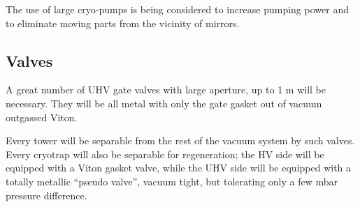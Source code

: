 The use of large cryo-pumps is being considered to increase pumping power and to eliminate moving parts from the vicinity of mirrors. 

\subsection{Valves} 
A great number of UHV gate valves with large aperture, up to 1 m will be necessary. They will be all metal with only the gate gasket out of vacuum outgassed Viton. 

Every tower will be separable from the rest of the vacuum system by such valves. Every cryotrap will also be separable for regeneration; the HV side will be equipped with a Viton gasket valve, while the UHV side will be equipped with a totally metallic ``pseudo valve'', vacuum tight, but tolerating only a few mbar pressure difference.
